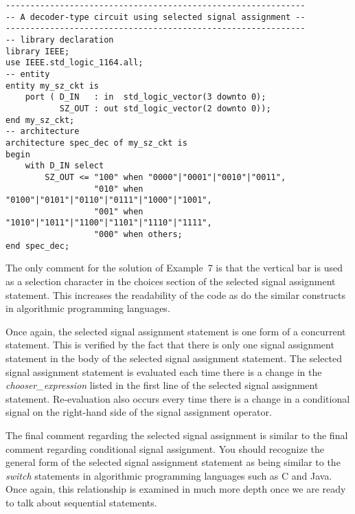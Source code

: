 \noindent
\begin{minipage}{0.99\linewidth}
\begin{lstlisting}[label=example_7, caption=Solution of Example~7.]
-------------------------------------------------------------
-- A decoder-type circuit using selected signal assignment --
-------------------------------------------------------------
-- library declaration
library IEEE;
use IEEE.std_logic_1164.all;
-- entity
entity my_sz_ckt is
	port ( D_IN   : in  std_logic_vector(3 downto 0);
	       SZ_OUT : out std_logic_vector(2 downto 0));
end my_sz_ckt;
-- architecture
architecture spec_dec of my_sz_ckt is
begin
	with D_IN select
		SZ_OUT <= "100" when "0000"|"0001"|"0010"|"0011",
		          "010" when "0100"|"0101"|"0110"|"0111"|"1000"|"1001",
		          "001" when "1010"|"1011"|"1100"|"1101"|"1110"|"1111",
		          "000" when others;
end spec_dec;
\end{lstlisting}
\end{minipage}

The only comment for the solution of Example~7 is that the vertical bar is used as a selection character in the choices section of the selected signal assignment statement. This increases the readability of the code as do the similar constructs in algorithmic programming languages.

Once again, the selected signal assignment statement is one form of a concurrent statement. This is verified by the fact that there is only one signal assignment statement in the body of the selected signal assignment statement. The selected signal assignment statement is evaluated each time there is a change in the \textit{chooser\_expression} listed in the first line of the selected signal assignment statement. Re-evaluation also occurs every time there is a change in a conditional signal on the right-hand side of the signal assignment operator.

The final comment regarding the selected signal assignment is similar to the final comment regarding conditional signal assignment. You should recognize the general form of the selected signal assignment statement as being similar to the \textit{switch} statements in algorithmic programming languages such as C and Java. Once again, this relationship is examined in much more depth once we are ready to talk about sequential statements.

